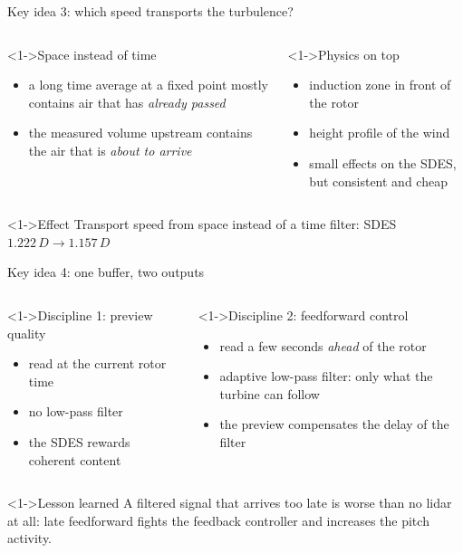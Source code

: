 \begin{frame}{Key idea 3: which speed transports the turbulence?}
	\begin{columns}[T]
		\column{7.0cm}
		\begin{block}<1->{Space instead of time}
			\begin{itemize}
				\item a long time average at a fixed point mostly contains air that has \emph{already passed}
				\item the measured volume upstream contains the air that is \emph{about to arrive} \cite{Schlipf2024d}
			\end{itemize}
		\end{block}
		\column{7.0cm}
		\begin{block}<1->{Physics on top}
			\begin{itemize}
				\item induction zone in front of the rotor
				\item height profile of the wind
				\item small effects on the SDES, but consistent and cheap
			\end{itemize}
		\end{block}
	\end{columns}
	\begin{alertblock}<1->{Effect}
		Transport speed from space instead of a time filter: SDES $1.222\,D \rightarrow 1.157\,D$
	\end{alertblock}
\end{frame}
\begin{frame}{Key idea 4: one buffer, two outputs}
	\begin{columns}[T]
		\column{7.0cm}
		\begin{block}<1->{Discipline 1: preview quality}
			\begin{itemize}
				\item read at the current rotor time
				\item no low-pass filter
				\item the SDES rewards coherent content
			\end{itemize}
		\end{block}
		\column{7.0cm}
		\begin{block}<1->{Discipline 2: feedforward control}
			\begin{itemize}
				\item read a few seconds \emph{ahead} of the rotor
				\item adaptive low-pass filter: only what the turbine can follow
				\item the preview compensates the delay of the filter
			\end{itemize}
		\end{block}
	\end{columns}
	\begin{alertblock}<1->{Lesson learned}
		A filtered signal that arrives too late is worse than no lidar at all:
		late feedforward fights the feedback controller and increases the pitch activity.
	\end{alertblock}
\end{frame}
